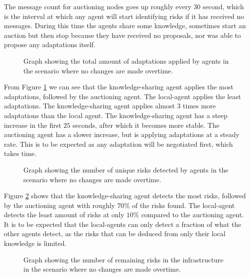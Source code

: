 The message count for auctioning nodes goes up roughly every $30$ second, which is the interval at which any agent will start identifying risks if it has received no messages. During this time the agents share some knowledge, sometimes start an auction but then stop because they have received no proposals, nor was able to propose any adaptations itself. 

\begin{figure}[H]
    \centering
    
    \caption{Graph showing the total amount of adaptations applied by agents in the scenario where no changes are made overtime.}
    \label{fig:proposals-no-change}
\end{figure}

From Figure \ref{fig:proposals-no-change} we can see that the knowledge-sharing agent applies the most adaptations, followed by the auctioning agent. The local-agent applies the least adaptations. The knowledge-sharing agent applies almost $3$ times  more adaptations than the local agent. The knowledge-sharing agent has a steep increase in the first $25$ seconds, after which it becomes more stable. The auctioning agent has a slower increase, but is applying adaptations at a steady rate. This is to be expected as any adaptation will be negotiated first, which takes time.

\begin{figure}[H]
    \centering
        
    \caption{Graph showing the number of unique risks detected by agents in the scenario where no changes are made overtime.}
    \label{fig:risk-count-no-change}
\end{figure}

Figure \ref{fig:risk-count-no-change} shows that the knowledge-sharing agent detects the most risks, followed by the auctioning agent with roughly $70\%$ of the risks found. The local-agent detects the least amount of risks at only $10\%$ compared to the auctioning agent. It is to be expected that the local-agents can only detect a fraction of what the other agents detect, as the risks that can be deduced from only their local knowledge is limited.

\begin{figure}[H]
    \centering
        
    \caption{Graph showing the number of remaining risks in the infrastructure in the scenario where no changes are made overtime.}
    \label{fig:risk-remaining-no-change}
\end{figure}


